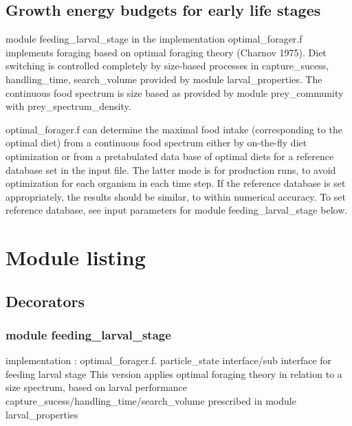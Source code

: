 \subsection{Growth energy budgets for early life stages} 

module feeding\_larval\_stage  in the implementation  optimal\_forager.f implements 
foraging based on optimal foraging theory (Charnov 1975). Diet switching is controlled completely by 
size-based processes in capture\_sucess, handling\_time, search\_volume provided by module larval\_properties. 
The continuous food spectrum is size based as provided by module prey\_community with prey\_spectrum\_density.
  
optimal\_forager.f can determine the maximal food intake (corresponding to the optimal diet) from a continuous food spectrum 
either by on-the-fly diet optimization or from a pretabulated data base of optimal diets for a reference database
set in the input file. The latter mode is for production runs, to avoid optimization for each organism in each 
time step. If the reference database is set appropriately, the results should be similar, to within numerical accuracy.
To set reference database, see input parameters for module feeding\_larval\_stage below.


\section{Module listing } 

\subsection{Decorators} 

\subsubsection{module feeding\_larval\_stage}                                     
implementation : optimal\_forager.f.
particle\_state interface/sub interface for feeding larval stage  
This version applies optimal foraging theory in relation to a size spectrum, based
on larval performance capture\_sucess/handling\_time/search\_volume
prescribed in module larval\_properties 

